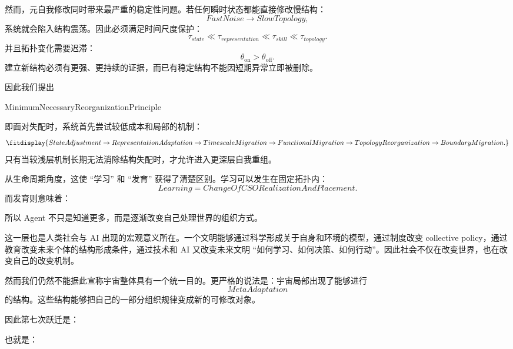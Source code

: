 然而，元自我修改同时带来最严重的稳定性问题。若任何瞬时状态都能直接修改慢结构：
\[
FastNoise
\rightarrow
SlowTopology,
\]
系统就会陷入结构震荡。因此必须满足时间尺度保护：
\[
\tau_{state}
\ll
\tau_{representation}
\ll
\tau_{skill}
\ll
\tau_{topology}.
\]
并且拓扑变化需要迟滞：
\[
\theta_{\mathrm{on}}
>
\theta_{\mathrm{off}}.
\]
建立新结构必须有更强、更持续的证据，而已有稳定结构不能因短期异常立即被删除。

因此我们提出
\begin{statementbox}
MinimumNecessaryReorganizationPrinciple
\end{statementbox}
即面对失配时，系统首先尝试较低成本和局部的机制：
\[
\fitdisplay{
StateAdjustment
\rightarrow
RepresentationAdaptation
\rightarrow
TimescaleMigration
\rightarrow
FunctionalMigration
\rightarrow
TopologyReorganization
\rightarrow
BoundaryMigration.
}
\]
只有当较浅层机制长期无法消除结构失配时，才允许进入更深层自我重组。

从生命周期角度，这使 ``学习'' 和 ``发育'' 获得了清楚区别。学习可以发生在固定拓扑内：
\[
Learning
=
ChangeOfCSORealizationAndPlacement.
\]
而发育则意味着：
\begin{statementbox}
\centering
{}
\end{statementbox}
所以 Agent 不只是知道更多，而是逐渐改变自己处理世界的组织方式。

这一层也是人类社会与 AI 出现的宏观意义所在。一个文明能够通过科学形成关于自身和环境的模型，通过制度改变 collective policy，通过教育改变未来个体的结构形成条件，通过技术和 AI 又改变未来文明 ``如何学习、如何决策、如何行动''。因此社会不仅在改变世界，也在改变自己的改变机制。

然而我们仍然不能据此宣称宇宙整体具有一个统一目的。更严格的说法是：宇宙局部出现了能够进行
\[
MetaAdaptation
\]
的结构。这些结构能够把自己的一部分组织规律变成新的可修改对象。

因此第七次跃迁是：
\begin{statementbox}
\centering
{}
\end{statementbox}
也就是：
\begin{statementbox}
\centering
{}
\end{statementbox}

